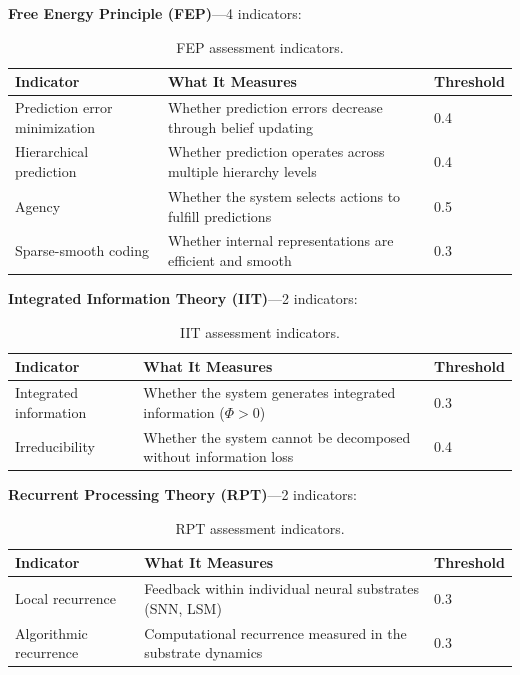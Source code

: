 \textbf{Free Energy Principle (FEP)}---4 indicators:

\begin{table}[t]
\centering
\begin{tabular}{p{3.5cm}p{7.5cm}l}
\toprule
\textbf{Indicator} & \textbf{What It Measures} & \textbf{Threshold} \\
\midrule
Prediction error minimization & Whether prediction errors decrease through belief updating & 0.4 \\
Hierarchical prediction & Whether prediction operates across multiple hierarchy levels & 0.4 \\
Agency & Whether the system selects actions to fulfill predictions & 0.5 \\
Sparse-smooth coding & Whether internal representations are efficient and smooth & 0.3 \\
\bottomrule
\end{tabular}
\caption{FEP assessment indicators.}
\label{tab:indicators-fep}
\end{table}

\textbf{Integrated Information Theory (IIT)}---2 indicators:

\begin{table}[t]
\centering
\begin{tabular}{p{3.5cm}p{7.5cm}l}
\toprule
\textbf{Indicator} & \textbf{What It Measures} & \textbf{Threshold} \\
\midrule
Integrated information & Whether the system generates integrated information ($\Phi > 0$) & 0.3 \\
Irreducibility & Whether the system cannot be decomposed without information loss & 0.4 \\
\bottomrule
\end{tabular}
\caption{IIT assessment indicators.}
\label{tab:indicators-iit}
\end{table}

\textbf{Recurrent Processing Theory (RPT)}---2 indicators:

\begin{table}[t]
\centering
\begin{tabular}{p{3.5cm}p{7.5cm}l}
\toprule
\textbf{Indicator} & \textbf{What It Measures} & \textbf{Threshold} \\
\midrule
Local recurrence & Feedback within individual neural substrates (SNN, LSM) & 0.3 \\
Algorithmic recurrence & Computational recurrence measured in the substrate dynamics & 0.3 \\
\bottomrule
\end{tabular}
\caption{RPT assessment indicators.}
\label{tab:indicators-rpt}
\end{table}

